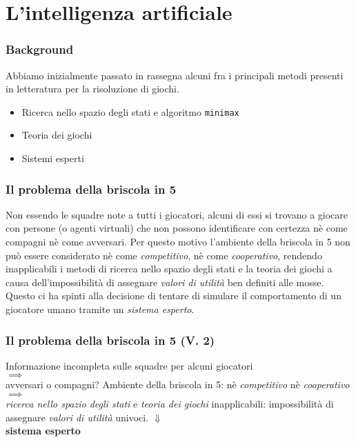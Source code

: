 \documentclass{beamer}
\newcommand*\lista{\item[$\diamondsuit$]}
\begin{document}
\section{L'intelligenza artificiale}

\begin{frame}
   \frametitle{Background}
   Abbiamo inizialmente passato in rassegna alcuni fra i principali metodi presenti in letteratura per la risoluzione di giochi.\\
   \begin{itemize}
      \lista Ricerca nello spazio degli stati e algoritmo \texttt{minimax} 
      \lista Teoria dei giochi
      \lista Sistemi esperti
   \end{itemize}
   
\end{frame}


\begin{frame}
   \frametitle{Il problema della briscola in 5}
   Non essendo le squadre note a tutti i giocatori, alcuni di essi si trovano a giocare con persone (o agenti virtuali) che non possono identificare con certezza nè come compagni nè come avversari.
   \vfill
   \pause
   Per questo motivo l'ambiente della briscola in 5 non può essere considerato nè come \emph{competitivo}, nè come \emph{cooperativo}, rendendo inapplicabili i metodi di ricerca nello spazio degli stati e la teoria dei giochi a causa dell'impossibilità di assegnare \emph{valori di utilità} ben definiti alle mosse.
   \vfill
   \pause   
   Questo ci ha spinti alla decisione di tentare di simulare il comportamento di un giocatore umano tramite un \emph{sistema esperto}.
   
\end{frame}



\begin{frame}
   \frametitle{Il problema della briscola in 5 (V. 2)}
   \centering
   Informazione incompleta sulle squadre per alcuni giocatori \\
   $\implies$\\
   avversari o compagni?
   \vfill
   \pause
   Ambiente della briscola in 5: nè \emph{competitivo} nè \emph{cooperativo} \\
   $\implies$\\
   \emph{ricerca nello spazio degli stati} e  \emph{teoria dei giochi} inapplicabili: impossibilità di assegnare \emph{valori di utilità} univoci.
   \vfill
   \pause
   \Large   
   $\Downarrow$\\
   \normalsize
   \textbf{sistema esperto}
   
\end{frame}
\end{document}
